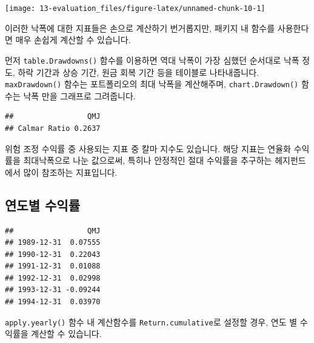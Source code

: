 \documentclass[12pt,]{book}
\newenvironment{Shaded}{\begin{snugshade}}{\end{snugshade}}
\newcommand{\KeywordTok}[1]{\textcolor[rgb]{0.13,0.29,0.53}{\textbf{#1}}}
\newcommand{\NormalTok}[1]{#1}
\newcommand{\OperatorTok}[1]{\textcolor[rgb]{0.81,0.36,0.00}{\textbf{#1}}}
\newcommand{\StringTok}[1]{\textcolor[rgb]{0.31,0.60,0.02}{#1}}
\begin{document}
\begin{center}\texttt{[image: 13-evaluation\_files/figure-latex/unnamed-chunk-10-1]} \end{center}

이러한 낙폭에 대한 지표들은 손으로 계산하기 번거롭지만, 패키지 내 함수를 사용한다면 매우 손쉽게 계산할 수 있습니다.

먼저 \texttt{table.Drawdowns()} 함수를 이용하면 역대 낙폭이 가장 심했던 순서대로 낙폭 정도, 하락 기간과 상승 기간, 원금 회복 기간 등을 테이블로 나타내줍니다. \texttt{maxDrawdown()} 함수는 포트폴리오의 최대 낙폭을 계산해주며, \texttt{chart.Drawdown()} 함수는 낙폭 만을 그래프로 그려줍니다.

\begin{Shaded}
\end{Shaded}

\begin{verbatim}
##                 QMJ
## Calmar Ratio 0.2637
\end{verbatim}

위험 조정 수익률 중 사용되는 지표 중 칼마 지수도 있습니다. 해당 지표는 연율화 수익률을 최대낙폭으로 나눈 값으로써, 특히나 안정적인 절대 수익률을 추구하는 헤지펀드에서 많이 참조하는 지표입니다.

\hypertarget{section-89}{%
\subsection{연도별 수익률}\label{section-89}}

\begin{Shaded}
\end{Shaded}

\begin{verbatim}
##                 QMJ
## 1989-12-31  0.07555
## 1990-12-31  0.22043
## 1991-12-31  0.01088
## 1992-12-31  0.02998
## 1993-12-31 -0.09244
## 1994-12-31  0.03970
\end{verbatim}

\texttt{apply.yearly()} 함수 내 계산함수를 \texttt{Return.cumulative}로 설정할 경우, 연도 별 수익률을 계산할 수 있습니다.
\end{document}
